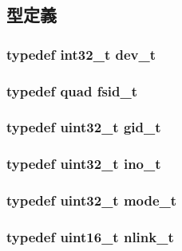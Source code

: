 \subsection{型定義}
\hypertarget{classTru64_abf62b93d918a43f0c5ee0ab777b1c3ef}{
\subsubsection[{dev\_\-t}]{\setlength{\rightskip}{0pt plus 5cm}typedef int32\_\-t {\bf dev\_\-t}}}
\label{classTru64_abf62b93d918a43f0c5ee0ab777b1c3ef}
\hypertarget{classTru64_abcb767738eec58d41562764284835524}{
\subsubsection[{fsid\_\-t}]{\setlength{\rightskip}{0pt plus 5cm}typedef {\bf quad} {\bf fsid\_\-t}}}
\label{classTru64_abcb767738eec58d41562764284835524}
\hypertarget{classTru64_aa7352f1065fe606194d792e2b292cf83}{
\subsubsection[{gid\_\-t}]{\setlength{\rightskip}{0pt plus 5cm}typedef {\bf uint32\_\-t} {\bf gid\_\-t}}}
\label{classTru64_aa7352f1065fe606194d792e2b292cf83}
\hypertarget{classTru64_aed4e918b44240739869c4bdb1c4787a9}{
\subsubsection[{ino\_\-t}]{\setlength{\rightskip}{0pt plus 5cm}typedef {\bf uint32\_\-t} {\bf ino\_\-t}}}
\label{classTru64_aed4e918b44240739869c4bdb1c4787a9}
\hypertarget{classTru64_af8f4385bb42836d1e3ad4fea9d71d1b9}{
\subsubsection[{mode\_\-t}]{\setlength{\rightskip}{0pt plus 5cm}typedef {\bf uint32\_\-t} {\bf mode\_\-t}}}
\label{classTru64_af8f4385bb42836d1e3ad4fea9d71d1b9}
\hypertarget{classTru64_a772a435921844488d52ef4df39b3e702}{
\subsubsection[{nlink\_\-t}]{\setlength{\rightskip}{0pt plus 5cm}typedef uint16\_\-t {\bf nlink\_\-t}}}
